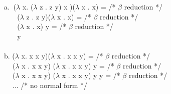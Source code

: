 a. $~$($\lambda$ x. ($\lambda$ z . z y) x )($\lambda$ x . x) =  /* $\beta$ reduction */ \\
    $~~~~~~~$ ($\lambda$ z . z y)($\lambda$ x . x) = /* $\beta$ reduction */ \\
    $~~~~~~~$ ($\lambda$ x . x) y = /* $\beta$ reduction */ \\
    $~~~~~~~$ y\\
\\
b. ($\lambda$ x. x x y)($\lambda$ x . x x y) = /* $\beta$ reduction */ \\
    $~~~~$ ($\lambda$ x . x x y) ($\lambda$ x . x x y) y = /* $\beta$ reduction */ \\
    $~~~~$ ($\lambda$ x . x x y) ($\lambda$ x . x x y) y y = /* $\beta$ reduction */ \\
    $~~~~$ ... /* no normal form */